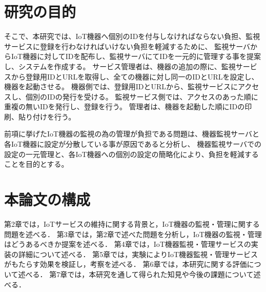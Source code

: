 \section{研究の目的}
そこで、本研究では、IoT機器へ個別のIDを付与しなければならない負担、監視サービスに登録を行わなければいけない負担を軽減するために、
監視サーバからIoT機器に対してIDを配布し、監視サーバにてIDを一元的に管理する事を提案し、システムを作成する。
サービス管理者は、機器の追加の際に、監視サービスから登録用IDとURLを取得し、全ての機器に対し同一のIDとURLを設定し、機器を起動させる。
機器側では、登録用IDとURLから、監視サービスにアクセスし、個別のIDの発行を受ける。
監視サービス側では、アクセスのあった順に重複の無いIDを発行し、登録を行う。
管理者は、機器を起動した順にIDの印刷、貼り付けを行う。

前項に挙げたIoT機器の監視の為の管理が負担である問題は、機器監視サーバと各IoT機器に設定が分散している事が原因であると分析し、
機器監視サーバでの設定の一元管理と、各IoT機器への個別の設定の簡略化により、負担を軽減することを目的とする。

\section{本論文の構成}
第2章では，IoTサービスの維持に関する背景と，IoT機器の監視・管理に関する問題を述べる．
第3章では，第2章で述べた問題を分析し，IoT機器の監視・管理はどうあるべきか提案を述べる．
第4章では，IoT機器監視・管理サービスの実装の詳細について述べる．
第5章では，実験によりIoT機器監視・管理サービスがもたらす効果を検証し，考察を述べる．
第6章では，本研究に関する評価について述べる．
第7章では，本研究を通して得られた知見や今後の課題について述べる．



